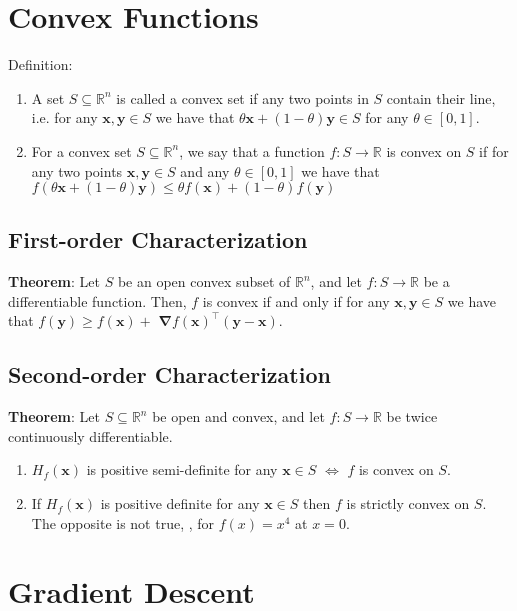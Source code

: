 \section{Convex Functions}

Definition:
\begin{enumerate}
    \item  A set $S \subseteq \mathbb{R}^{n}$ is called a convex set if any two points in $S$ contain their line, i.e. for any $\boldsymbol{x}, \boldsymbol{y} \in S$ we have that $\theta \boldsymbol{x}+(1-\theta) \boldsymbol{y} \in S$ for any $\theta \in[0,1]$.
    \item For a convex set $S \subseteq \mathbb{R}^{n}$, we say that a function $f: S \rightarrow \mathbb{R}$ is convex on $S$ if for any two points $\boldsymbol{x}, \boldsymbol{y} \in S$ and any $\theta \in[0,1]$ we have that
    $
    f(\theta \boldsymbol{x}+(1-\theta) \boldsymbol{y}) \leq \theta f(\boldsymbol{x})+(1-\theta) f(\boldsymbol{y})
    $
\end{enumerate}


\subsection{First-order Characterization}
\textbf{Theorem}:
Let $S$ be an open convex subset of $\mathbb{R}^{n}$, and let $f: S \rightarrow \mathbb{R}$ be a differentiable function. Then, $f$ is convex if and only if for any $\boldsymbol{x}, \boldsymbol{y} \in S$ we have that $f(\boldsymbol{y}) \geq f(\boldsymbol{x})+$ $\boldsymbol{\nabla} f(\boldsymbol{x})^{\top}(\boldsymbol{y}-\boldsymbol{x}) .$

\subsection{Second-order Characterization}
\textbf{Theorem}:
Let $S \subseteq \mathbb{R}^{n}$ be open and convex, and let $f: S \rightarrow \mathbb{R}$ be twice continuously differentiable.
\begin{enumerate}
    \item $H_{f}(\boldsymbol{x})$ is positive semi-definite for any $\boldsymbol{x} \in S$ $\Leftrightarrow$ $f$ is convex on $S$.
    \item If $H_{f}(\boldsymbol{x})$ is positive definite for any $\boldsymbol{x} \in S$ then $f$ is strictly convex on $S$. The opposite is not true, \eg, for $f(x)=x^4$ at $x=0$.
\end{enumerate}

\section{Gradient Descent}

